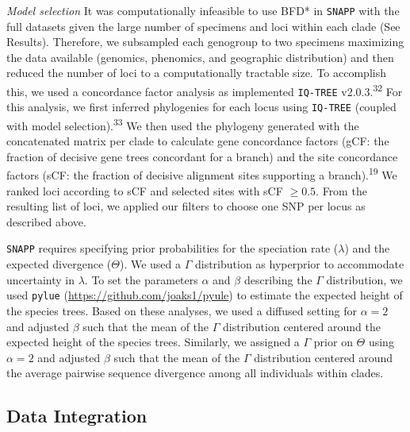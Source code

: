 \documentclass[
  11pt,
]{article}
\begin{document}
\emph{Model selection} It was computationally infeasible to use BFD* in \texttt{SNAPP} with the full datasets given the large number of specimens and loci within each clade (See Results). Therefore, we subsampled each genogroup to two specimens maximizing the data available (genomics, phenomics, and geographic distribution) and then reduced the number of loci to a computationally tractable size. To accomplish this, we used a concordance factor analysis as implemented \texttt{IQ-TREE} v2.0.3.\textsuperscript{32} For this analysis, we first inferred phylogenies for each locus using \texttt{IQ-TREE} (coupled with model selection).\textsuperscript{33} We then used the phylogeny generated with the concatenated matrix per clade to calculate gene concordance factors (gCF: the fraction of decisive gene trees concordant for a branch) and the site concordance factors (sCF: the fraction of decisive alignment sites supporting a branch).\textsuperscript{19} We ranked loci according to sCF and selected sites with sCF \(\geqslant 0.5\). From the resulting list of loci, we applied our filters to choose one SNP per locus as described above.

\texttt{SNAPP} requires specifying prior probabilities for the speciation rate (\(\lambda\)) and the expected divergence (\(\Theta\)). We used a \(\Gamma\) distribution as hyperprior to accommodate uncertainty in \(\lambda\). To set the parameters \(\alpha\) and \(\beta\) describing the \(\Gamma\) distribution, we used \texttt{pylue} (\url{https://github.com/joaks1/pyule}) to estimate the expected height of the species trees. Based on these analyses, we used a diffused setting for \(\alpha=2\) and adjusted \(\beta\) such that the mean of the \(\Gamma\) distribution centered around the expected height of the species trees. Similarly, we assigned a \(\Gamma\) prior on \(\Theta\) using \(\alpha=2\) and adjusted \(\beta\) such that the mean of the \(\Gamma\) distribution centered around the average pairwise sequence divergence among all individuals within clades.

\hypertarget{data-integration}{%
\subsection{Data Integration}\label{data-integration}}
\end{document}
